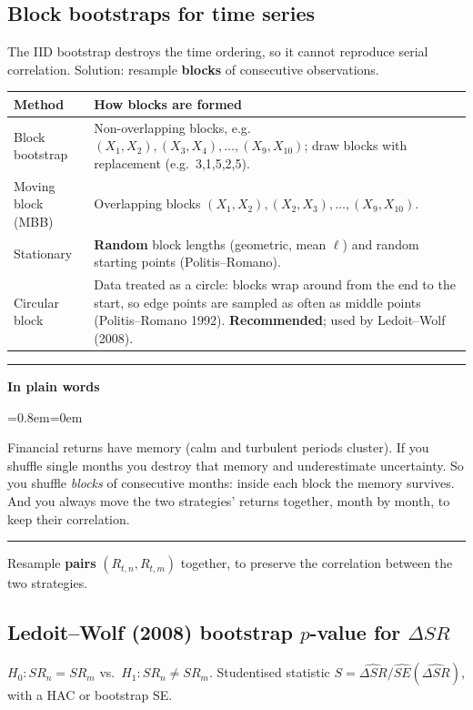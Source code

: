 \documentclass[11pt,a4paper]{report}
\newenvironment{notebox}[1]
  {\par\medskip\Needspace{6\baselineskip}\noindent\rule{\linewidth}{0.4pt}\par\nopagebreak
   \noindent\textbf{#1}\par\nopagebreak
   \begin{list}{}{\leftmargin=0.8em\rightmargin=0em\topsep=2pt}\item[]}
  {\end{list}\nopagebreak\noindent\rule{\linewidth}{0.4pt}\par\medskip}
\newenvironment{plainbox}{\begin{notebox}{In plain words}}{\end{notebox}}
\begin{document}
\subsection{Block bootstraps for time series}
The IID bootstrap destroys the time ordering, so it cannot reproduce serial
correlation. Solution: resample \textbf{blocks} of consecutive observations.
\begin{center}
\begin{tabularx}{\textwidth}{@{}lX@{}}
\toprule
Method & How blocks are formed \\
\midrule
Block bootstrap & Non-overlapping blocks, e.g.\ $(X_1,X_2),(X_3,X_4),\dots,(X_9,X_{10})$; draw blocks with replacement (e.g.\ 3,1,5,2,5). \\
Moving block (MBB) & Overlapping blocks $(X_1,X_2),(X_2,X_3),\dots,(X_9,X_{10})$. \\
Stationary & \textbf{Random} block lengths (geometric, mean $\ell$) and random starting points (Politis--Romano). \\
Circular block & Data treated as a circle: blocks wrap around from the end to the start, so edge points are sampled as often as middle points (Politis--Romano 1992). \textbf{Recommended}; used by Ledoit--Wolf (2008). \\
\bottomrule
\end{tabularx}
\end{center}
\begin{plainbox}
Financial returns have memory (calm and turbulent periods cluster). If you
shuffle single months you destroy that memory and underestimate uncertainty. So
you shuffle \emph{blocks} of consecutive months: inside each block the memory
survives. And you always move the two strategies' returns together, month by
month, to keep their correlation.
\end{plainbox}
Resample \textbf{pairs} $(R_{t,n},R_{t,m})$ together, to preserve the correlation
between the two strategies.

\subsection{Ledoit--Wolf (2008) bootstrap $p$-value for $\Delta SR$}
$H_0:SR_n=SR_m$ vs.\ $H_1:SR_n\ne SR_m$. Studentised statistic
$S=\widehat{\Delta SR}/\widehat{SE}(\widehat{\Delta SR})$, with a HAC or bootstrap SE.
\end{document}
